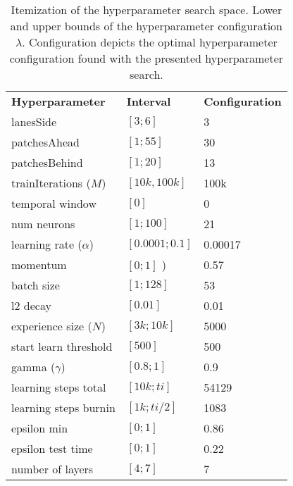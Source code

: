 \documentclass{article}
\begin{document}
\begin{table}[ht]
	\centering
	\caption{Itemization of the hyperparameter search space. Lower and upper bounds of the hyperparameter configuration $\lambda$. Configuration depicts the optimal hyperparameter configuration found with the presented hyperparameter search.}
	\begin{tabular*}{\columnwidth}{p{}p{}p{}}
		\textbf{Hyperparameter}     & \textbf{Interval} & \textbf{Configuration} \\
		lanesSide					& $[3; 6]$      &					3\\
		patchesAhead 				& $[1; 55]$     &					30\\
		patchesBehind 				& $[1; 20]$     &					13\\
		trainIterations ($M$) 		& $[10k, 100k]$ &					100k\\
	    temporal window 			& $[0]$         &					0\\
		num neurons					& $[1; 100]$    &					21\\
		learning rate ($\alpha$)    & $[0.0001; 0.1]$ &					0.00017\\
		momentum					& $[0;1]$ )     &					0.57\\
		batch size 					& $[1; 128]$    &					53\\
		l2 decay 					& $[0.01]$      &					0.01\\
		experience size ($N$) 		& $[3k; 10k]$   &					5000\\
		start learn threshold 		& $[500]$       &					500\\
		gamma ($\gamma$)			& $[0.8; 1]$    &					0.9\\
		learning steps total 		& $[10k; ti]$ &					54129\\
		learning steps burnin 		& $[1k; ti/2]$&					1083\\
		epsilon min 				& $[0; 1]$ &					0.86\\
		epsilon test time 			& $[0; 1]$ &					0.22\\
		number of layers 			& $[4;7]$  &					7\\
	\end{tabular*}
	\label{tab:Hyperparameter}
\end{table}
\end{document}
